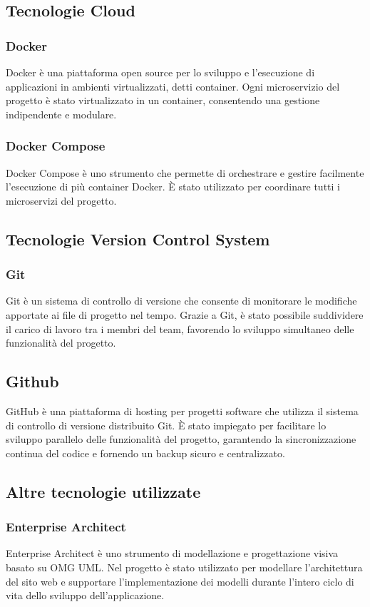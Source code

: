 \subsection{Tecnologie Cloud}
\subsubsection{Docker}
Docker è una piattaforma open source per lo sviluppo e l'esecuzione di applicazioni in ambienti virtualizzati, detti container. Ogni microservizio del progetto è stato virtualizzato in un container, consentendo una gestione indipendente e modulare.

\subsubsection{Docker Compose}
Docker Compose è uno strumento che permette di orchestrare e gestire facilmente l'esecuzione di più container Docker. È stato utilizzato per coordinare tutti i microservizi del progetto.

\subsection{Tecnologie Version Control System}
\subsubsection{Git}
Git è un sistema di controllo di versione che consente di monitorare le modifiche apportate ai file di progetto nel tempo. Grazie a Git, è stato possibile suddividere il carico di lavoro tra i membri del team, favorendo lo sviluppo simultaneo delle funzionalità del progetto.

\subsection{Github}
GitHub è una piattaforma di hosting per progetti software che utilizza il sistema di controllo di versione distribuito Git. È stato impiegato per facilitare lo sviluppo parallelo delle funzionalità del progetto, garantendo la sincronizzazione continua del codice e fornendo un backup sicuro e centralizzato.

\subsection{Altre tecnologie utilizzate}
\subsubsection{Enterprise Architect}
Enterprise Architect è uno strumento di modellazione e progettazione visiva basato su OMG UML. Nel progetto è stato utilizzato per modellare l'architettura del sito web e supportare l'implementazione dei modelli durante l'intero ciclo di vita dello sviluppo dell'applicazione.


